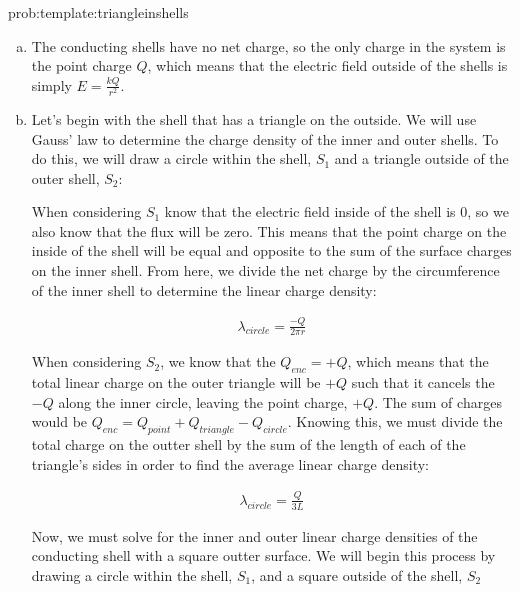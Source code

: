 \begin{solution}{prob:template:triangleinshells}\label{soln:template:triangleinshells}
	
	\begin{enumerate}[(a)]
	
	\item The conducting shells have no net charge, so the only charge in the system is the point charge $Q$, which means that the electric field outside of the shells is simply $E = \frac{kQ}{r^2}$.
	
	\item Let's begin with the shell that has a triangle on the outside. We will use Gauss' law to determine the charge density of the inner and outer shells. To do this, we will draw a circle within the shell, $S_1$ and a triangle outside of the outer shell, $S_2$:
	
	
	
	 When considering $S_1$ know that the electric field inside of the shell is $0$, so we also know that the flux will be zero. This means that the point charge on the inside of the shell will be equal and opposite to the sum of the surface charges on the inner shell. From here, we divide the net charge by the circumference of the inner shell to determine the linear charge density:
	
	\begin{align*}
		\lambda_{circle} = \frac{-Q}{2\pi r}
	\end{align*}
		
	When considering $S_2$, we know that the $Q_{enc} = +Q$, which means that the total linear charge on the outer triangle will be $+Q$ such that it cancels the $-Q$ along the inner circle, leaving the point charge, $+Q$. The sum of charges would be $Q_{enc} = Q_{point}+Q_{triangle}-Q_{circle}$. Knowing this, we must divide the total charge on the outter shell by the sum of the length of each of the triangle's sides in order to find the average linear charge density:
	
	\begin{align*}
		\lambda_{circle} = \frac{Q}{3L}
	\end{align*}
	
	Now, we must solve for the inner and outer linear charge densities of the conducting shell with a square outter surface. We will begin this process by drawing a circle within the shell, $S_1$, and a square outside of the shell, $S_2$
	

\end{enumerate}
\end{solution}
